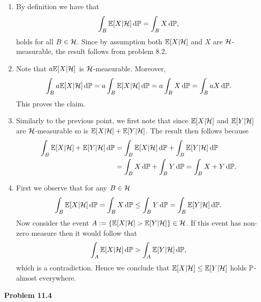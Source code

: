 \begin{enumerate}[label={(\alph*)}]
\item By definition we have that
\[
	\int_B \mathbb E[X | \mathcal H] \, \mathrm{d} \mathbb P = \int_B X \, \mathrm{d} \mathbb P,
\]
holds for all $B \in \mathcal H$. Since by assumption both $\mathbb E[X | \mathcal H]$ and $X$ are $\mathcal H$-measurable, the result follows from problem 8.2.
\item Note that $a \mathbb E[X | \mathcal H]$ is $\mathcal H$-measurable. Moreover,
\[
	\int_B a \mathbb E[X | \mathcal H] \, \mathrm{d} \mathbb P = a \int_B \mathbb E[X | \mathcal H] \, \mathrm{d} \mathbb P = a \int_B X \, \mathrm{d} \mathbb P = \int_B aX \, \mathrm{d} \mathbb P.
\]
This proves the claim.
\item Similarly to the previous point, we first note that since $\mathbb E[X | \mathcal H]$ and $\mathbb E[Y | \mathcal H]$ are $\mathcal H$-measurable so is $\mathbb E[X | \mathcal H] + \mathbb E[Y | \mathcal H]$. The result then follows because
\begin{align*}
	\int_B \mathbb E[X | \mathcal H] + \mathbb E[Y | \mathcal H] \, \mathrm{d} \mathbb P 
	&= \int_B \mathbb E[X | \mathcal H] \, \mathrm{d} \mathbb P + \int_B \mathbb E[Y | \mathcal H] \, \mathrm{d} \mathbb P \\
	&= \int_B X \, \mathrm{d} \mathbb P + \int_B Y \, \mathrm{d} \mathbb P = \int_B X + Y \, \mathrm{d} \mathbb P.
\end{align*}
\item First we observe that for any $B \in \mathcal H$
\[
	\int_B \mathbb E[X | \mathcal H] \, \mathrm{d} \mathbb P = \int_B X \, \mathrm{d} \mathbb P \le \int_B Y \, \mathrm{d} \mathbb P = \int_B \mathbb E[Y | \mathcal H] \, \mathrm{d} \mathbb P.
\]
Now consider the event $A := \{ \mathbb E[X | \mathcal H] > \mathbb E[Y | \mathcal H]\} \in \mathcal H$. If this event has non-zero measure then it would follow that
\[
	\int_A \mathbb E[X | \mathcal H] \, \mathrm{d} \mathbb P > \int_A \mathbb E[Y | \mathcal H] \, \mathrm{d} \mathbb P,
\]
which is a contradiction. Hence we conclude that $\mathbb E[X | \mathcal H] \le \mathbb E[Y | \mathcal H]$ holds $\mathbb P$-almost everywhere.
\end{enumerate}

\bigskip

\textbf{Problem 11.4}

